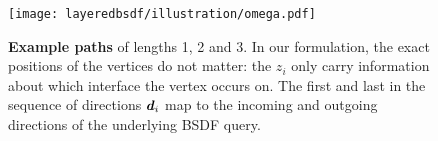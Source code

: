 \begin{figure}[h]
	\centering
	\texttt{[image: layeredbsdf/illustration/omega.pdf]}
	\caption[Example paths]{\label{fig:layeredbsdf:paths}
		\textbf{Example paths} of lengths 1, 2 and 3.
		In our formulation, the exact positions of the vertices do not matter: the $z_i$ only carry information about which interface the vertex occurs on.
		The first and last in the sequence of directions $\bm{d}_i$ map to the incoming and outgoing directions of the underlying BSDF query.
	}
\end{figure}